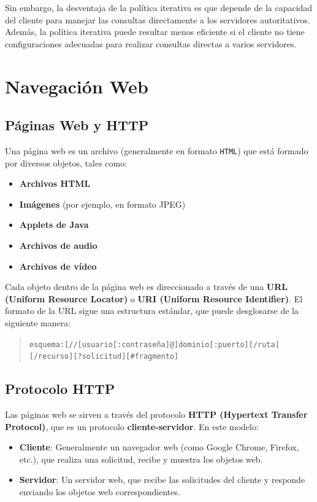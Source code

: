 \documentclass[a4paper,12pt]{article}
\begin{document}
Sin embargo, la desventaja de la política iterativa es que depende de la capacidad del cliente para manejar las consultas directamente a los servidores autoritativos. Además, la política iterativa puede resultar menos eficiente si el cliente no tiene configuraciones adecuadas para realizar consultas directas a varios servidores.

\section{Navegación Web}

\subsection{Páginas Web y HTTP}

Una página web es un archivo (generalmente en formato \texttt{HTML}) que está formado por diversos objetos, tales como:

\begin{itemize}
    \item \textbf{Archivos HTML}
    \item \textbf{Imágenes} (por ejemplo, en formato JPEG)
    \item \textbf{Applets de Java}
    \item \textbf{Archivos de audio}
    \item \textbf{Archivos de vídeo}
\end{itemize}

Cada objeto dentro de la página web es direccionado a través de una \textbf{URL (Uniform Resource Locator)} o \textbf{URI (Uniform Resource Identifier)}. El formato de la URL sigue una estructura estándar, que puede desglosarse de la siguiente manera:

\begin{quote}
\texttt{esquema:[//[usuario[:contraseña]@]dominio[:puerto][/ruta][/recurso][?solicitud][\#fragmento]}
\end{quote}

\subsection{Protocolo HTTP}
Las páginas web se sirven a través del protocolo \textbf{HTTP (Hypertext Transfer Protocol)}, que es un protocolo \textbf{cliente-servidor}. En este modelo:

\begin{itemize}
    \item \textbf{Cliente}: Generalmente un navegador web (como Google Chrome, Firefox, etc.), que realiza una solicitud, recibe y muestra los objetos web.
    \item \textbf{Servidor}: Un servidor web, que recibe las solicitudes del cliente y responde enviando los objetos web correspondientes.
\end{itemize}
\end{document}
